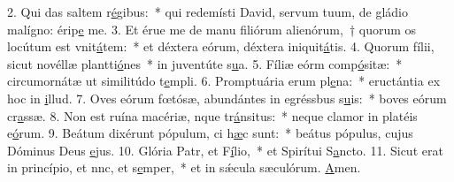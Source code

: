 2. Qui das saltem r\uline{é}gibus:~* qui redemísti David, servum tuum, de gládio malígno: érip\uline{e} me.
3. Et érue me de manu filiórum alienórum,~† quorum os locútum est vnit\uline{á}tem:~* et déxtera eórum, déxtera iniquit\uline{á}tis.
4. Quorum fílii, sicut novéllæ plantti\uline{ó}nes~* in juventúte s\uline{u}a.
5. Fíliæ eórm comp\uline{ó}sitæ:~* circumornátæ ut similitúdo t\uline{e}mpli.
6. Promptuária erum pl\uline{e}na:~* eructántia ex hoc in \uline{i}llud.
7. Oves eórum fœtósæ, abundántes in egréssbus s\uline{u}is:~* boves eórum cr\uline{a}ssæ.
8. Non est ruína macériæ, nque tr\uline{á}nsitus:~* neque clamor in platéis e\uline{ó}rum.
9. Beátum dixérunt pópulum, ci h\uline{æ}c sunt:~* beátus pópulus, cujus Dóminus Deus \uline{e}jus.
10. Glória Patr, et F\uline{í}lio,~* et Spirítui S\uline{a}ncto.
11. Sicut erat in princípio, et nnc, et s\uline{e}mper,~* et in sǽcula sæculórum. \uline{A}men.
